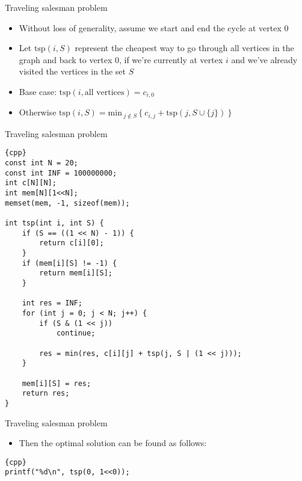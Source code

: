 \begin{frame}[fragile]{Traveling salesman problem}
    \begin{itemize}
\item Without loss of generality, assume we start and end the cycle at vertex $0$
\item Let $\mathrm{tsp}(i, S)$ represent the cheapest way to go through all vertices in the graph and back to vertex $0$, if we're currently at vertex $i$ and we've already visited the vertices in the set $S$
\item Base case: $\mathrm{tsp}(i, \textrm{all vertices}) = c_{i,0}$
\item Otherwise $\mathrm{tsp}(i, S) = \mathrm{min}_{\ j \not\in S\ } \{\ c_{i,j} + \mathrm{tsp}(j, S \cup \{j\})\ \}$
    \end{itemize}
\end{frame}

\begin{frame}[fragile]{Traveling salesman problem}
    \begin{lstlisting}[basicstyle=\scriptsize]{cpp}
const int N = 20;
const int INF = 100000000;
int c[N][N];
int mem[N][1<<N];
memset(mem, -1, sizeof(mem));

int tsp(int i, int S) {
    if (S == ((1 << N) - 1)) {
        return c[i][0];
    }
    if (mem[i][S] != -1) {
        return mem[i][S];
    }

    int res = INF;
    for (int j = 0; j < N; j++) {
        if (S & (1 << j))
            continue;

        res = min(res, c[i][j] + tsp(j, S | (1 << j)));
    }

    mem[i][S] = res;
    return res;
}
    \end{lstlisting}
\end{frame}

\begin{frame}[fragile]{Traveling salesman problem}
    \begin{itemize}
\item Then the optimal solution can be found as follows:
    \end{itemize}

    \begin{lstlisting}{cpp}
printf("%d\n", tsp(0, 1<<0));
    \end{lstlisting}
\end{frame}

